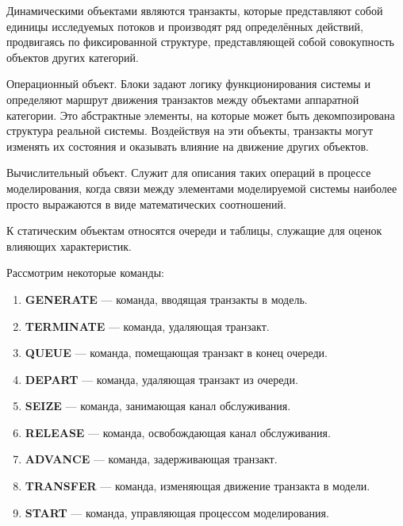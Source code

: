 Динамическими объектами являются транзакты, которые представляют собой единицы исследуемых потоков и производят ряд определённых
действий, продвигаясь по фиксированной структуре, представляющей собой
совокупность объектов других категорий.

Операционный объект. Блоки задают логику функционирования
системы и определяют маршрут движения транзактов между объектами
аппаратной категории. Это абстрактные элементы, на которые может быть
декомпозирована структура реальной системы. Воздействуя на эти объекты,
транзакты могут изменять их состояния и оказывать влияние на движение
других объектов.

Вычислительный объект. Служит для описания таких операций
в процессе моделирования, когда связи между элементами моделируемой
системы наиболее просто выражаются в виде математических соотношений.

К статическим объектам относятся очереди и таблицы, служащие
для оценок влияющих характеристик.

Рассмотрим некоторые команды:
\begin{enumerate}
	\item \textbf{GENERATE} --- команда, вводящая транзакты в модель.
	\item \textbf{TERMINATE} ---  команда, удаляющая транзакт.
	\item \textbf{QUEUE} --- команда, помещающая транзакт в конец очереди.
	\item \textbf{DEPART} --- команда, удаляющая транзакт из очереди.
	\item \textbf{SEIZE} --- команда, занимающая канал обслуживания.
	\item \textbf{RELEASE} --- команда, освобождающая канал обслуживания.
	\item \textbf{ADVANCE} ---  команда, задерживающая транзакт.
	\item \textbf{TRANSFER} --- команда, изменяющая движение транзакта в модели.
	\item \textbf{START} --- команда, управляющая процессом моделирования.
\end{enumerate}